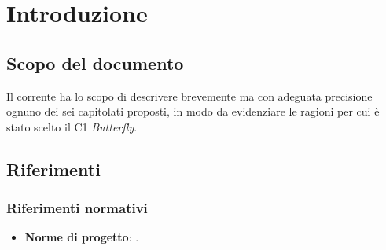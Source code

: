\section{Introduzione} \label{introduzione}

    \subsection{Scopo del documento}
    Il  corrente ha lo scopo di descrivere brevemente ma con adeguata precisione ognuno dei sei capitolati proposti,
    in modo da evidenziare le ragioni per cui è stato scelto il  C1 \textit{Butterfly}.

    

    

    \subsection{Riferimenti}

        \subsubsection{Riferimenti normativi}
            \begin{itemize}
                \item \textbf{Norme di progetto}: .
            \end{itemize}

